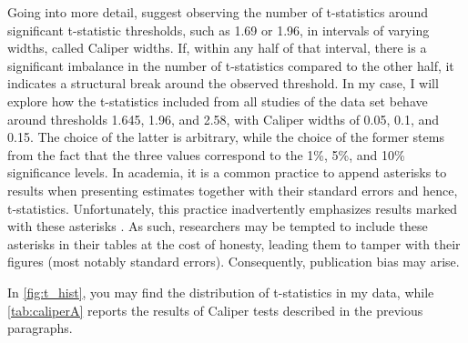 Going into more detail, \cite{gerber2008caliper} suggest observing the number of t-statistics around significant t-statistic thresholds, such as 1.69 or 1.96, in intervals of varying widths, called Caliper widths. If, within any half of that interval, there is a significant imbalance in the number of t-statistics compared to the other half, it indicates a structural break around the observed threshold. In my case, I will explore how the t-statistics included from all studies of the data set behave around thresholds 1.645, 1.96, and 2.58, with Caliper widths of 0.05, 0.1, and 0.15. The choice of the latter is arbitrary, while the choice of the former stems from the fact that the three values correspond to the 1\%, 5\%, and 10\% significance levels. In academia, it is a common practice to append asterisks to results when presenting estimates together with their standard errors and hence, t-statistics. Unfortunately, this practice inadvertently emphasizes results marked with these asterisks \citep{simmons2011false}. As such, researchers may be tempted to include these asterisks in their tables at the cost of honesty, leading them to tamper with their figures (most notably standard errors). Consequently, publication bias may arise.

In \autoref{fig:t_hist}, you may find the distribution of t-statistics in my data, while \autoref{tab:caliperA} reports the results of Caliper tests described in the previous paragraphs.

